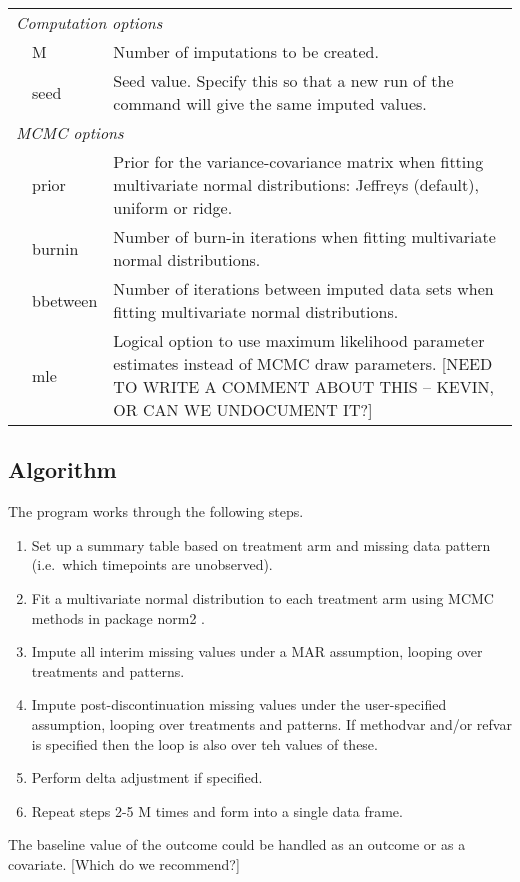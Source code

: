 \begin{tabular}{llp{.8\linewidth}}
\multicolumn{3}{l}{\em Computation options}\\
& M 	&	 Number of imputations to be created. \\
& seed 	&	 Seed value. Specify this so that a new run of the command will give the same imputed values.	\\

\multicolumn{3}{l}{\em MCMC options} \\
& prior 	&	 Prior for the variance-covariance matrix when fitting multivariate normal distributions: Jeffreys (default), uniform or ridge.	\\
& burnin 	&	 Number of burn-in iterations when fitting multivariate normal distributions.	\\
& bbetween 	&	 Number of iterations between imputed data sets when fitting multivariate normal distributions.	\\
& mle 	&	 Logical option to use maximum likelihood parameter estimates instead of MCMC draw parameters. 
[NEED TO WRITE A COMMENT ABOUT THIS -- KEVIN, OR CAN WE UNDOCUMENT IT?]	\\ \hline
\end{tabular}

\subsection{Algorithm}

The program works through the following steps.
\begin{enumerate}
\item Set up a summary table based on treatment arm and missing data pattern (i.e.\ which timepoints are unobserved).
\item Fit a multivariate normal distribution to each treatment arm using MCMC methods in package norm2 \citep{norm2}.
\item Impute all interim missing values under a MAR assumption, looping over treatments and patterns.
\item Impute post-discontinuation missing values under the user-specified assumption, looping over treatments and patterns. If methodvar and/or refvar is specified then the loop is also over teh values of these.
\item Perform delta adjustment if specified.
\item Repeat steps 2-5 M times and form into a single data frame.
\end{enumerate}
The baseline value of the outcome could be handled as an outcome or as a covariate. 
[Which do we recommend?] 

